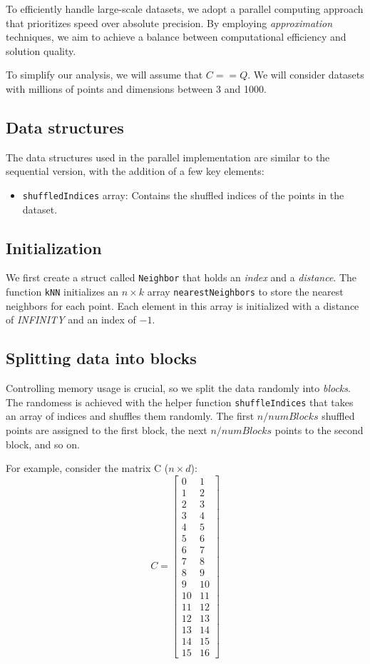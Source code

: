 \documentclass{article}
\begin{document}
To efficiently handle large-scale datasets, we adopt a parallel computing approach that prioritizes speed over absolute precision. 
By employing \emph{approximation} techniques, we aim to achieve a balance between computational efficiency and solution quality.

To simplify our analysis, we will assume that $C==Q$. We will consider datasets with millions of points and dimensions between 3 and 1000.

\subsection{Data structures}
The data structures used in the parallel implementation are similar to the sequential version, with the addition of a few key elements:
\begin{itemize}
    \item \texttt{shuffledIndices} array: Contains the shuffled indices of the points in the dataset.
    
\end{itemize}

\subsection{Initialization}
We first create a struct called \texttt{Neighbor} that holds an \emph{index} and a \emph{distance}.
The function \texttt{kNN} initializes an $n \times k$ array \texttt{nearestNeighbors} to store the nearest neighbors for each point.
Each element in this array is initialized with a distance of \emph{INFINITY} and an index of $-1$.

\subsection{Splitting data into blocks}
Controlling memory usage is crucial, so we split the data randomly into \emph{blocks}. The randomess is achieved with the helper 
function \texttt{shuffleIndices} that takes an array of indices and shuffles them randomly. The first $n / numBlocks$ shuffled
points are assigned to the first block, the next $n / numBlocks$ points to the second block, and so on.

For example, consider the matrix C ($n \times d$):
\[
C = \begin{bmatrix}
0 & 1 \\
1 & 2 \\
2 & 3 \\
3 & 4 \\
4 & 5 \\
5 & 6 \\
6 & 7 \\
7 & 8 \\
8 & 9 \\
9 & 10 \\
10 & 11 \\
11 & 12 \\
12 & 13 \\
13 & 14 \\
14 & 15 \\
15 & 16
\end{bmatrix}
\]
\end{document}
